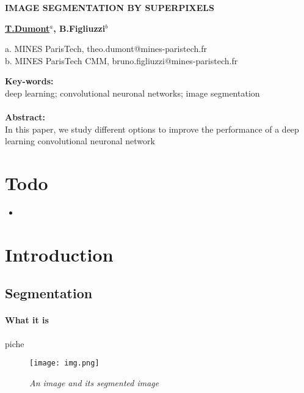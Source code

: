 \documentclass{article}
\begin{document}
\newcommand{\spp}{superpixel}

\begin{center}
    \begin{Large}\textbf{IMAGE SEGMENTATION BY SUPERPIXELS}\end{Large}

    \vspace{1cm}
    \begin{large}\textbf{\underline{T.Dumont$^a$}, B.Figliuzzi$^b$}\end{large}

    \vspace{0.5cm}
    a. MINES ParisTech, theo.dumont@mines-paristech.fr\\
    b. MINES ParisTech CMM, bruno.figliuzzi@mines-paristech.fr
    \vspace{1cm}
\end{center}

\begin{center}
\noindent\textbf{Key-words: }\\
deep learning; convolutional neuronal networks; image segmentation\\
\ \\
\textbf{Abstract: }\\
In this paper, we study different options to improve the performance of a deep learning convolutional neuronal network
\end{center}

\tableofcontents

\section*{Todo}
\begin{itemize}
    \item
\end{itemize}

\newpage
\section{Introduction}

\subsection{Segmentation}
\paragraph{What it is}piche

\begin{figure}[!htb]
    \centering
    \texttt{[image: img.png]}
    \caption{\textit{An image and its segmented image}}
    \label{fig:segm}
\end{figure}
\end{document}

